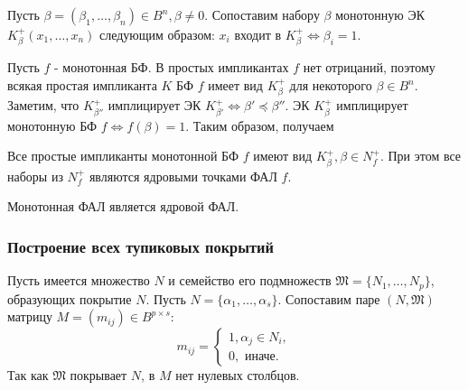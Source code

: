\documentclass[11pt]{article}
\newcounter{th}\setcounter{th}{0}
\newcounter{cnsqnc}\setcounter{cnsqnc}{0}
\def\cnsqnc{\par\smallskip\refstepcounter{cnsqnc}\textbf{\arabic{cnsqnc}}}
\newtheorem*{Consequence}{Следствие \cnsqnc}
\newcounter{stnmt}\setcounter{stnmt}{0}
\def\st{\par\smallskip\refstepcounter{stnmt}\textbf{\arabic{stnmt}}}
\newtheorem*{Statement}{Утверждение \st}
\begin{document}
Пусть \(\beta = (\beta_1, \ldots, \beta_n) \in B^n, \beta \neq 0\). Сопоставим набору \(\beta\)
монотонную ЭК \(K_\beta^+(x_1, \ldots, x_n)\) следующим образом: \(x_i\) входит в
\(K_{\beta}^+ \Leftrightarrow \beta_i = 1\).

Пусть \(f\) - монотонная БФ. В простых импликантах \(f\) нет отрицаний, поэтому всякая простая
импликанта \(K\) БФ \(f\) имеет вид \(K_{\beta}^+\) для некоторого \(\beta \in B^n\). Заметим, что
\(K_{\beta''}^+\) имплицирует ЭК \(K_{\beta'}^+ \Leftrightarrow \beta' \preceq \beta''\).
ЭК \(K_{\beta}^+\) имплицирует монотонную БФ \(f \Leftrightarrow f(\beta) = 1\). Таким образом,
получаем
\begin{Statement}
Все простые импликанты монотонной БФ $f$ имеют вид $K_{\beta}^+, \beta \in N_f^+$.
При этом все наборы из $N_f^+$ являются ядровыми точками ФАЛ $f$.
\end{Statement}
\begin{Consequence}
Монотонная ФАЛ является ядровой ФАЛ.
\end{Consequence}
\subsubsection{Построение всех тупиковых покрытий}
\label{sec:org9fe94aa}
Пусть имеется множество \(N\) и семейство его подмножеств \(\mathfrak{M} = \{N_1, \ldots, N_p\}\),
образующих покрытие \(N\). Пусть \(N = \{\alpha_1, \ldots, \alpha_s\}\). Сопоставим паре
\((N, \mathfrak{M})\) матрицу \(M = (m_{ij}) \in B^{p\times s}\):
\begin{equation*}
m_{ij} = \begin{cases}
1, \alpha_j \in N_i, \\
0, \text{ иначе.}
\end{cases}
\end{equation*}
Так как \(\mathfrak{M}\) покрывает \(N\), в \(M\) нет нулевых столбцов.
\end{document}
